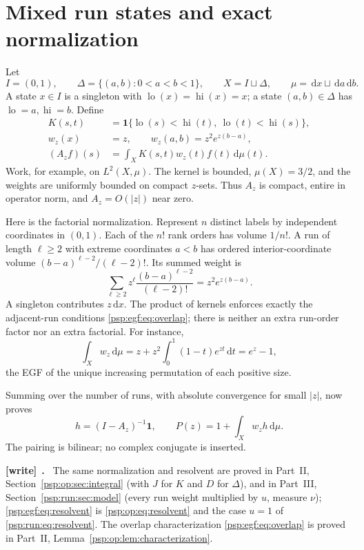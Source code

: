 \documentclass[11pt,letterpaper]{article}
\numberwithin{equation}{section}
\theoremstyle{remark}\newtheorem{remark}[theorem]{Remark}
\newcommand{\dd}{\,\mathrm d}
\newcommand{\one}{\mathbf1}
\newcommand{\lo}{\operatorname{lo}}
\newcommand{\hi}{\operatorname{hi}}
\newenvironment{writenote}[1][]{\par\smallskip\begingroup\small
 \noindent\textbf{[write]}\if\relax\detokenize{#1}\relax\else~\textbf{#1.}\fi\ }%
 {\par\endgroup\smallskip}
\begin{document}
\section{Mixed run states and exact normalization}\label{psp:egf:sec:model}
Let
\[
 I=(0,1),\qquad \Delta=\{(a,b):0<a<b<1\},\qquad
 X=I\sqcup\Delta,\qquad \mu=\dd x\sqcup\dd a\dd b.
\]
A state $x\in I$ is a singleton with $\lo(x)=\hi(x)=x$; a state
$(a,b)\in\Delta$ has $\lo=a,\hi=b$. Define
\begin{align}
 K(s,t)&=\one\{\lo(s)<\hi(t),\ \lo(t)<\hi(s)\},\label{psp:egf:eq:K}\\
 w_z(x)&=z,\qquad w_z(a,b)=z^2e^{z(b-a)},\label{psp:egf:eq:weight}\\
 (A_zf)(s)&=\int_X K(s,t)w_z(t)f(t)\dd\mu(t).
 \label{psp:egf:eq:operator}
\end{align}
Work, for example, on $L^2(X,\mu)$. The kernel is bounded, $\mu(X)=3/2$,
and the weights are uniformly bounded on compact $z$-sets. Thus $A_z$
is compact, entire in operator norm, and $A_z=O(|z|)$ near zero.

Here is the factorial normalization. Represent $n$ distinct labels by
independent coordinates in $(0,1)$. Each of the $n!$ rank orders has
volume $1/n!$. A run of length $\ell\geq2$ with extreme coordinates
$a<b$ has ordered interior-coordinate volume
$(b-a)^{\ell-2}/(\ell-2)!$. Its summed weight is
\[
 \sum_{\ell\geq2}z^\ell\frac{(b-a)^{\ell-2}}{(\ell-2)!}
 =z^2e^{z(b-a)}.
\]
A singleton contributes $z\dd x$. The product of kernels enforces exactly
the adjacent-run conditions \eqref{psp:egf:eq:overlap}; there is neither an
extra run-order factor nor an extra factorial. For instance,
\[
 \int_Xw_z\dd\mu=z+z^2\int_0^1(1-t)e^{zt}\dd t=e^z-1,
\]
the EGF of the unique increasing permutation of each positive size.

Summing over the number of runs, with absolute convergence for small
$|z|$, now proves
\begin{equation}\label{psp:egf:eq:resolvent}
 h=(I-A_z)^{-1}\one,\qquad
 P(z)=1+\int_Xw_z h\dd\mu.
\end{equation}
The pairing is bilinear; no complex conjugate is inserted.
\begin{writenote}
The same normalization and resolvent are proved in Part~II, Section~\ref{psp:op:sec:integral} (with $J$ for $K$ and $D$ for $\Delta$), and in Part~III, Section~\ref{psp:run:sec:model} (every run weight multiplied by $u$, measure $\nu$); \eqref{psp:egf:eq:resolvent} is \eqref{psp:op:eq:resolvent} and the case $u=1$ of \eqref{psp:run:eq:resolvent}. The overlap characterization \eqref{psp:egf:eq:overlap} is proved in Part~II, Lemma~\ref{psp:op:lem:characterization}.
\end{writenote}
\end{document}
